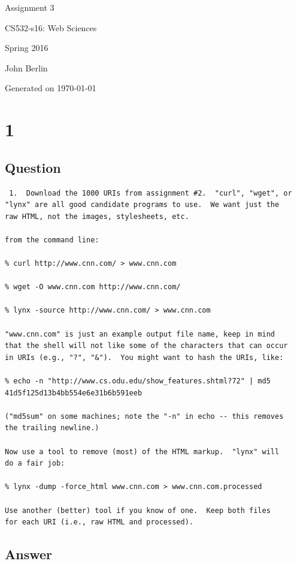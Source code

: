 \documentclass[letterpaper,10pt]{article}
\begin{document}
 

\begin{titlepage}

\begin{center}

\Huge{Assignment 3}

\Large{CS532-s16:  Web Sciences}

\Large{Spring 2016}

\Large{John Berlin}

\Large Generated on \today

\end{center}

\end{titlepage}
\newpage
\section*{1}
\subsection*{Question}
\begin{verbatim}
 1.  Download the 1000 URIs from assignment #2.  "curl", "wget", or
"lynx" are all good candidate programs to use.  We want just the
raw HTML, not the images, stylesheets, etc.

from the command line:

% curl http://www.cnn.com/ > www.cnn.com

% wget -O www.cnn.com http://www.cnn.com/

% lynx -source http://www.cnn.com/ > www.cnn.com

"www.cnn.com" is just an example output file name, keep in mind
that the shell will not like some of the characters that can occur
in URIs (e.g., "?", "&").  You might want to hash the URIs, like:

% echo -n "http://www.cs.odu.edu/show_features.shtml?72" | md5
41d5f125d13b4bb554e6e31b6b591eeb

("md5sum" on some machines; note the "-n" in echo -- this removes
the trailing newline.) 

Now use a tool to remove (most) of the HTML markup.  "lynx" will
do a fair job:

% lynx -dump -force_html www.cnn.com > www.cnn.com.processed

Use another (better) tool if you know of one.  Keep both files 
for each URI (i.e., raw HTML and processed).
\end{verbatim}
\subsection*{Answer}
\end{document}
